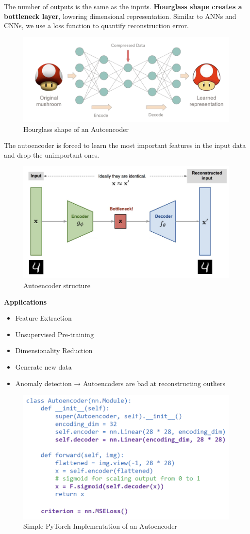 The number of outputs is the same as the inputs.\textbf{ Hourglass shape creates a bottleneck layer}, lowering dimensional representation. Similar to ANNs and CNNs, we use a loss function to quantify reconstruction error.

\begin{figure}[h!t]
    \centering
    \includegraphics[width=0.6\linewidth]{hourglass.png}
    \caption{Hourglass shape of an Autoencoder}
    \label{fig:enter-label}
\end{figure}

The autoencoder is forced to learn the most important features in the input data and drop the unimportant ones.
\begin{figure}[h!t]
    \centering
    \includegraphics[width=0.65\linewidth]{Autoencoder.png}
    \caption{Autoencoder structure}
    \label{fig:enter-label}
\end{figure}


\newpage
\textbf{Applications}
\begin{itemize}
    \item Feature Extraction
    \item Unsupervised Pre-training
    \item Dimensionality Reduction
    \item Generate new data
    \item Anomaly detection → Autoencoders are bad at reconstructing outliers\\
\end{itemize}

\begin{figure}[h!t]
    \centering
    \includegraphics[width=0.5\linewidth]{autoencoderpy.png}
    \caption{Simple PyTorch Implementation of an Autoencoder}
    \label{fig:enter-label}
\end{figure}

